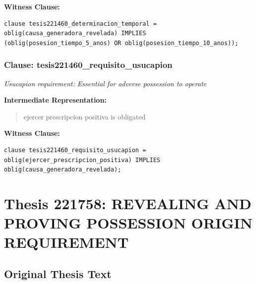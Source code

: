 \documentclass[11pt,a4paper]{article}
\begin{document}
\textbf{Witness Clause:}

\begin{lstlisting}[style=witnessstyle, language=Witness]
clause tesis221460_determinacion_temporal = oblig(causa_generadora_revelada) IMPLIES (oblig(posesion_tiempo_5_anos) OR oblig(posesion_tiempo_10_anos));
\end{lstlisting}

\subsubsection{Clause: tesis221460\_requisito\_usucapion}

\textit{Usucapion requirement: Essential for adverse possession to operate}

\textbf{Intermediate Representation:}

\begin{quote}
ejercer prescripcion positiva is obligated
\end{quote}

\textbf{Witness Clause:}

\begin{lstlisting}[style=witnessstyle, language=Witness]
clause tesis221460_requisito_usucapion = oblig(ejercer_prescripcion_positiva) IMPLIES oblig(causa_generadora_revelada);
\end{lstlisting}

\newpage

\section{Thesis 221758: REVEALING AND PROVING POSSESSION ORIGIN REQUIREMENT}
\label{thesis:221758}

\subsection{Original Thesis Text}
\end{document}
